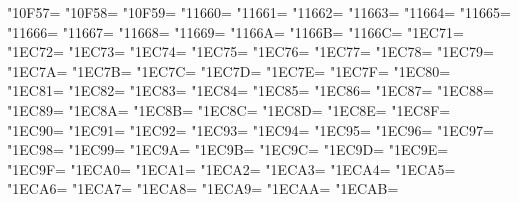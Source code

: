 \XeTeXcharclass"10F57=\KclassArabU
\XeTeXcharclass"10F58=\KclassArabU
\XeTeXcharclass"10F59=\KclassArabU
\XeTeXcharclass"11660=\KclassArabU
\XeTeXcharclass"11661=\KclassArabU
\XeTeXcharclass"11662=\KclassArabU
\XeTeXcharclass"11663=\KclassArabU
\XeTeXcharclass"11664=\KclassArabU
\XeTeXcharclass"11665=\KclassArabU
\XeTeXcharclass"11666=\KclassArabU
\XeTeXcharclass"11667=\KclassArabU
\XeTeXcharclass"11668=\KclassArabU
\XeTeXcharclass"11669=\KclassArabU
\XeTeXcharclass"1166A=\KclassArabU
\XeTeXcharclass"1166B=\KclassArabU
\XeTeXcharclass"1166C=\KclassArabU
\XeTeXcharclass"1EC71=\KclassArabU
\XeTeXcharclass"1EC72=\KclassArabU
\XeTeXcharclass"1EC73=\KclassArabU
\XeTeXcharclass"1EC74=\KclassArabU
\XeTeXcharclass"1EC75=\KclassArabU
\XeTeXcharclass"1EC76=\KclassArabU
\XeTeXcharclass"1EC77=\KclassArabU
\XeTeXcharclass"1EC78=\KclassArabU
\XeTeXcharclass"1EC79=\KclassArabU
\XeTeXcharclass"1EC7A=\KclassArabU
\XeTeXcharclass"1EC7B=\KclassArabU
\XeTeXcharclass"1EC7C=\KclassArabU
\XeTeXcharclass"1EC7D=\KclassArabU
\XeTeXcharclass"1EC7E=\KclassArabU
\XeTeXcharclass"1EC7F=\KclassArabU
\XeTeXcharclass"1EC80=\KclassArabU
\XeTeXcharclass"1EC81=\KclassArabU
\XeTeXcharclass"1EC82=\KclassArabU
\XeTeXcharclass"1EC83=\KclassArabU
\XeTeXcharclass"1EC84=\KclassArabU
\XeTeXcharclass"1EC85=\KclassArabU
\XeTeXcharclass"1EC86=\KclassArabU
\XeTeXcharclass"1EC87=\KclassArabU
\XeTeXcharclass"1EC88=\KclassArabU
\XeTeXcharclass"1EC89=\KclassArabU
\XeTeXcharclass"1EC8A=\KclassArabU
\XeTeXcharclass"1EC8B=\KclassArabU
\XeTeXcharclass"1EC8C=\KclassArabU
\XeTeXcharclass"1EC8D=\KclassArabU
\XeTeXcharclass"1EC8E=\KclassArabU
\XeTeXcharclass"1EC8F=\KclassArabU
\XeTeXcharclass"1EC90=\KclassArabU
\XeTeXcharclass"1EC91=\KclassArabU
\XeTeXcharclass"1EC92=\KclassArabU
\XeTeXcharclass"1EC93=\KclassArabU
\XeTeXcharclass"1EC94=\KclassArabU
\XeTeXcharclass"1EC95=\KclassArabU
\XeTeXcharclass"1EC96=\KclassArabU
\XeTeXcharclass"1EC97=\KclassArabU
\XeTeXcharclass"1EC98=\KclassArabU
\XeTeXcharclass"1EC99=\KclassArabU
\XeTeXcharclass"1EC9A=\KclassArabU
\XeTeXcharclass"1EC9B=\KclassArabU
\XeTeXcharclass"1EC9C=\KclassArabU
\XeTeXcharclass"1EC9D=\KclassArabU
\XeTeXcharclass"1EC9E=\KclassArabU
\XeTeXcharclass"1EC9F=\KclassArabU
\XeTeXcharclass"1ECA0=\KclassArabU
\XeTeXcharclass"1ECA1=\KclassArabU
\XeTeXcharclass"1ECA2=\KclassArabU
\XeTeXcharclass"1ECA3=\KclassArabU
\XeTeXcharclass"1ECA4=\KclassArabU
\XeTeXcharclass"1ECA5=\KclassArabU
\XeTeXcharclass"1ECA6=\KclassArabU
\XeTeXcharclass"1ECA7=\KclassArabU
\XeTeXcharclass"1ECA8=\KclassArabU
\XeTeXcharclass"1ECA9=\KclassArabU
\XeTeXcharclass"1ECAA=\KclassArabU
\XeTeXcharclass"1ECAB=\KclassArabU
